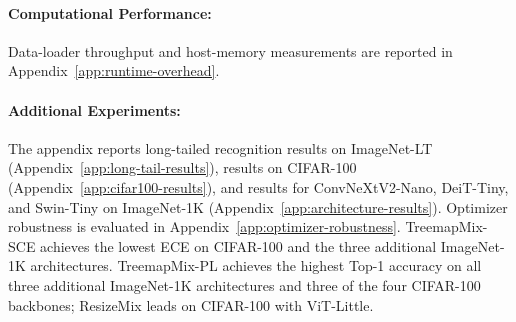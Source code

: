

\paragraph{Computational Performance:}
\label{sec:runtime}
Data-loader throughput and host-memory measurements are reported in
Appendix~\ref{app:runtime-overhead}.

\paragraph{Additional Experiments:}
The appendix reports long-tailed recognition results on ImageNet-LT
(Appendix~\ref{app:long-tail-results}), results on CIFAR-100
(Appendix~\ref{app:cifar100-results}), and results for ConvNeXtV2-Nano,
DeiT-Tiny, and Swin-Tiny on ImageNet-1K
(Appendix~\ref{app:architecture-results}).
Optimizer robustness is evaluated in Appendix~\ref{app:optimizer-robustness}.
TreemapMix-SCE achieves the lowest ECE on CIFAR-100 and the three additional
ImageNet-1K architectures.
TreemapMix-PL achieves the highest Top-1 accuracy on all three additional
ImageNet-1K architectures and three of the four CIFAR-100 backbones;
ResizeMix leads on CIFAR-100 with ViT-Little.
